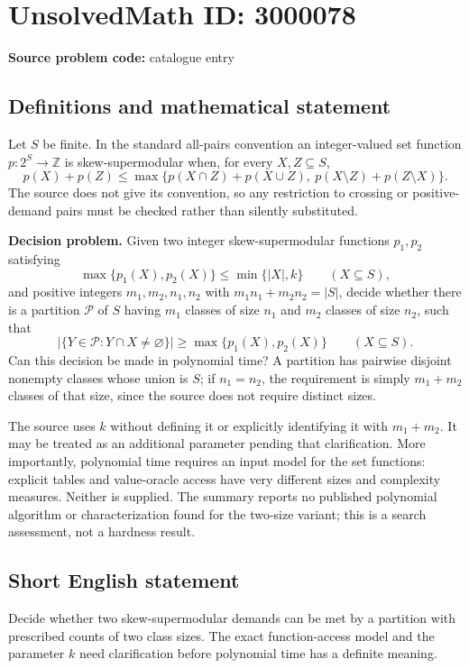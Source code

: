\documentclass[11pt]{article}
\begin{document}
\section*{UnsolvedMath ID: 3000078}
\textbf{Source problem code:} catalogue entry
\subsection{Definitions and mathematical statement}
Let $S$ be finite. In the standard all-pairs convention an integer-valued set function $p:2^S\to\mathbb Z$ is skew-supermodular when, for every $X,Z\subseteq S$,
\[
p(X)+p(Z)\leq\max\{p(X\cap Z)+p(X\cup Z),\ p(X\setminus Z)+p(Z\setminus X)\}.
\]
The source does not give its convention, so any restriction to crossing or positive-demand pairs must be checked rather than silently substituted.

\textbf{Decision problem.} Given two integer skew-supermodular functions $p_1,p_2$ satisfying
\[
\max\{p_1(X),p_2(X)\}\leq\min\{|X|,k\}\qquad(X\subseteq S),
\]
and positive integers $m_1,m_2,n_1,n_2$ with $m_1n_1+m_2n_2=|S|$, decide whether there is a partition $\mathcal P$ of $S$ having $m_1$ classes of size $n_1$ and $m_2$ classes of size $n_2$, such that
\[
\big|\{Y\in\mathcal P:Y\cap X\ne\varnothing\}\big|
\geq\max\{p_1(X),p_2(X)\}\qquad(X\subseteq S).
\]
Can this decision be made in polynomial time? A partition has pairwise disjoint nonempty classes whose union is $S$; if $n_1=n_2$, the requirement is simply $m_1+m_2$ classes of that size, since the source does not require distinct sizes.

The source uses $k$ without defining it or explicitly identifying it with $m_1+m_2$. It may be treated as an additional parameter pending that clarification. More importantly, polynomial time requires an input model for the set functions: explicit tables and value-oracle access have very different sizes and complexity measures. Neither is supplied. The summary reports no published polynomial algorithm or characterization found for the two-size variant; this is a search assessment, not a hardness result.
\subsection{Short English statement}
Decide whether two skew-supermodular demands can be met by a partition with prescribed counts of two class sizes. The exact function-access model and the parameter $k$ need clarification before polynomial time has a definite meaning.
\end{document}
